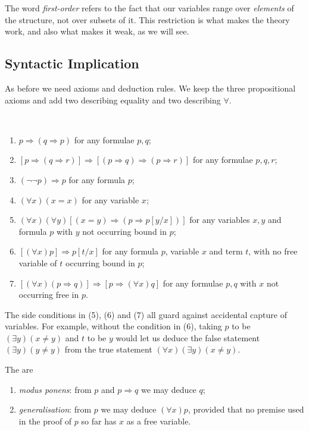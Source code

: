 The word \emph{first-order} refers to the fact that our variables range over \emph{elements} of the structure, not over subsets of it. This restriction is what makes the theory work, and also what makes it weak, as we will see.

\subsection{Syntactic Implication}

As before we need axioms and deduction rules. We keep the three propositional axioms and add two describing equality and two describing $\forall$.

\begin{axiom}~
  \begin{enumerate}[label=(\arabic*)]
    \item $p \Rightarrow (q \Rightarrow p)$ for any formulae $p, q$;
    \item $[p \Rightarrow (q \Rightarrow r)] \Rightarrow [(p \Rightarrow q) \Rightarrow (p \Rightarrow r)]$ for any formulae $p, q, r$;
    \item $(\lnot \lnot p) \Rightarrow p$ for any formula $p$;
    \item $(\forall x)(x = x)$ for any variable $x$;
    \item $(\forall x)(\forall y)[(x = y) \Rightarrow (p \Rightarrow p[y/x])]$ for any variables $x, y$ and formula $p$ with $y$ not occurring bound in $p$;
    \item $[(\forall x)p] \Rightarrow p[t/x]$ for any formula $p$, variable $x$ and term $t$, with no free variable of $t$ occurring bound in $p$;
    \item $[(\forall x)(p\Rightarrow q)] \Rightarrow [p\Rightarrow(\forall x)q]$ for any formulae $p, q$ with $x$ not occurring free in $p$.
  \end{enumerate}
\end{axiom}

The side conditions in (5), (6) and (7) all guard against accidental capture of variables. For example, without the condition in (6), taking $p$ to be $(\exists y)(x \neq y)$ and $t$ to be $y$ would let us deduce the false statement $(\exists y)(y \neq y)$ from the true statement $(\forall x)(\exists y)(x \neq y)$.

\begin{definition}
  The  are
  \begin{enumerate}[label=(\roman*)]
    \item \emph{modus ponens}: from $p$ and $p \Rightarrow q$ we may deduce $q$;
    \item \emph{generalisation}: from $p$ we may deduce $(\forall x)p$, provided that no premise used in the proof of $p$ so far has $x$ as a free variable.
  \end{enumerate}
\end{definition}

